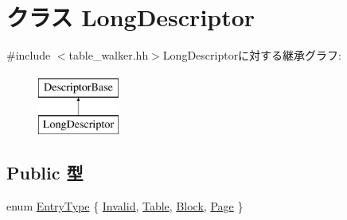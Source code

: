 \hypertarget{classArmISA_1_1TableWalker_1_1LongDescriptor}{
\section{クラス LongDescriptor}
\label{classArmISA_1_1TableWalker_1_1LongDescriptor}
}


{\ttfamily \#include $<$table\_\-walker.hh$>$}LongDescriptorに対する継承グラフ:\begin{figure}[H]
\begin{center}
\leavevmode
\includegraphics[height=2cm]{classArmISA_1_1TableWalker_1_1LongDescriptor}
\end{center}
\end{figure}
\subsection*{Public 型}
\begin{DoxyCompactItemize}
\item 
enum \hyperlink{classArmISA_1_1TableWalker_1_1LongDescriptor_a9ed8d16c9ae7fae285dd2146c3159023}{EntryType} \{ \hyperlink{classArmISA_1_1TableWalker_1_1LongDescriptor_a9ed8d16c9ae7fae285dd2146c3159023ae962ea8b0b3a376575ad0e616eeac474}{Invalid}, 
\hyperlink{classArmISA_1_1TableWalker_1_1LongDescriptor_a9ed8d16c9ae7fae285dd2146c3159023abdc82221e2bc2a210036a9bf0bb088b3}{Table}, 
\hyperlink{classArmISA_1_1TableWalker_1_1LongDescriptor_a9ed8d16c9ae7fae285dd2146c3159023aa00f801460e81f86eab56d86fe627551}{Block}, 
\hyperlink{classArmISA_1_1TableWalker_1_1LongDescriptor_a9ed8d16c9ae7fae285dd2146c3159023a9d1a03a60ec11b699d2dd9dce1133327}{Page}
 \}
\end{DoxyCompactItemize}
